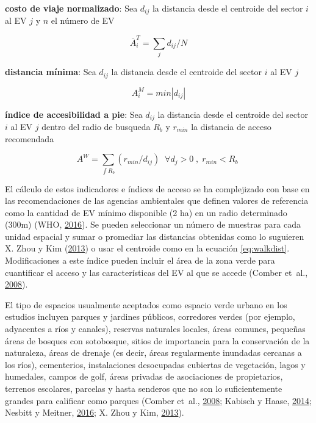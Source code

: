 \documentclass[12pt,a4paper,openany]{book}
\theoremstyle{definition}
\theoremstyle{definition}
\theoremstyle{definition}
\theoremstyle{remark}
\begin{document}
\textbf{costo de viaje normalizado}: Sea \(d_{ij}\) la distancia desde
el centroide del sector \(i\) al EV \(j\) y \(n\) el número de EV

\begin{equation}
\bar{A}^{T}_i =\sum_j{d_{ij}/N}
\label{eq:ncosto}
\end{equation}

\textbf{distancia mínima}: Sea \(d_{ij}\) la distancia desde el
centroide del sector \(i\) al EV \(j\)

\begin{equation}
A^{M}_i=min\left | d_{ij} \right | 
\label{eq:mindist}
\end{equation}

\textbf{índice de accesibilidad a pie}: Sea \(d_{ij}\) la distancia
desde el centroide del sector \(i\) al EV \(j\) dentro del radio de
busqueda \(R_b\) y \(r_{min}\) la distancia de acceso recomendada

\begin{equation}
A^{W}= \sum_{\int R_b }{(r_{min}/d_{ij})}  \;  \; \forall  d_j>0 \; , \; r_{min}<R_b  \;
\label{eq:walkdist}
\end{equation}

El cálculo de estos indicadores e índices de acceso se ha complejizado
con base en las recomendaciones de las agencias ambientales que definen
valores de referencia como la cantidad de EV mínimo disponible (2 ha) en
un radio determinado (300m) (WHO,
\protect\hyperlink{ref-who2016urban}{2016}). Se pueden seleccionar un
número de muestras para cada unidad espacial y sumar o promediar las
distancias obtenidas como lo suguieren X. Zhou y Kim
(\protect\hyperlink{ref-zhou_social_2013}{2013}) o usar el centroide
como en la ecuación \eqref{eq:walkdist}. Modificaciones a este índice
pueden incluir el área de la zona verde para cuantificar el acceso y las
características del EV al que se accede (Comber et~al.,
\protect\hyperlink{ref-comber_using_2008}{2008}).

El tipo de espacios usualmente aceptados como espacio verde urbano en
los estudios incluyen parques y jardines públicos, corredores verdes
(por ejemplo, adyacentes a ríos y canales), reservas naturales locales,
áreas comunes, pequeñas áreas de bosques con sotobosque, sitios de
importancia para la conservación de la naturaleza, áreas de drenaje (es
decir, áreas regularmente inundadas cercanas a los ríos), cementerios,
instalaciones desocupadas cubiertas de vegetación, lagos y humedales,
campos de golf, áreas privadas de asociaciones de propietarios, terrenos
escolares, parcelas y hasta senderos que no son lo suficientemente
grandes para calificar como parques (Comber et~al.,
\protect\hyperlink{ref-comber_using_2008}{2008}; Kabisch y Haase,
\protect\hyperlink{ref-kabisch_green_2014}{2014}; Nesbitt y Meitner,
\protect\hyperlink{ref-nesbitt_exploring_2016}{2016}; X. Zhou y Kim,
\protect\hyperlink{ref-zhou_social_2013}{2013}).
\end{document}
